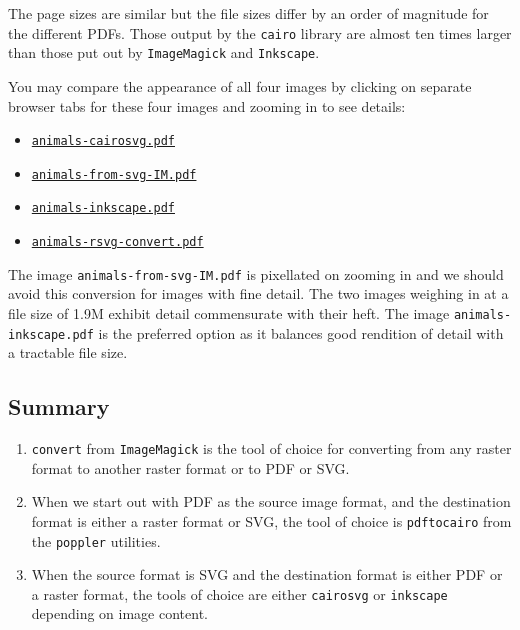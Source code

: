 \documentclass[
  11pt,
  british,
  a4paper,
]{article}
\providecommand{\tightlist}{%
  \setlength{\itemsep}{0pt}\setlength{\parskip}{0pt}}
\begin{document}
The page sizes are similar but the file sizes differ by an order of
magnitude for the different PDFs. Those output by the \texttt{cairo}
library are almost ten times larger than those put out by
\texttt{ImageMagick} and \texttt{Inkscape}.

You may compare the appearance of all four images by clicking on
separate browser tabs for these four images and zooming in to see
details:

\begin{itemize}
\tightlist
\item
  \href{images/animals-cairosvg.pdf}{\texttt{animals-cairosvg.pdf}}
\item
  \href{images/animals-from-svg-IM.pdf}{\texttt{animals-from-svg-IM.pdf}}
\item
  \href{images/animals-inkscape.pdf}{\texttt{animals-inkscape.pdf}}
\item
  \href{images/animals-rsvg-convert.pdf}{\texttt{animals-rsvg-convert.pdf}}
\end{itemize}

The image \texttt{animals-from-svg-IM.pdf} is pixellated on zooming in
and we should avoid this conversion for images with fine detail. The two
images weighing in at a file size of 1.9M exhibit detail commensurate
with their heft. The image \texttt{animals-inkscape.pdf} is the
preferred option as it balances good rendition of detail with a
tractable file size.

\hypertarget{summary}{%
\subsection{Summary}\label{summary}}

\begin{enumerate}
\item
  \texttt{convert} from \texttt{ImageMagick} is the tool of choice for
  converting from any raster format to another raster format or to PDF
  or SVG.
\item
  When we start out with PDF as the source image format, and the
  destination format is either a raster format or SVG, the tool of
  choice is \texttt{pdftocairo} from the \texttt{poppler} utilities.
\item
  When the source format is SVG and the destination format is either PDF
  or a raster format, the tools of choice are either \texttt{cairosvg}
  or \texttt{inkscape} depending on image content.
\end{enumerate}
\end{document}
